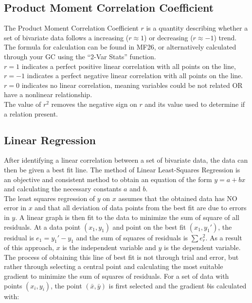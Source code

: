 \documentclass[../main]{subfiles}
\begin{document}
	\subsection{Product Moment Correlation Coefficient}

	The Product Moment Correlation Coefficient \(r\) is a quantity describing whether a set of bivariate data follows a increasing (\(r \approx 1\)) or decreasing (\(r \approx -1\)) trend. The formula for calculation can be found in MF26, or alternatively calculated through your GC using the ``2-Var Stats'' function. \\

	\(r=1\) indicates a perfect positive linear correlation with all points on the line, \(r=-1\) indicates a perfect negative linear correlation with all points on the line. \(r=0\) indicates no linear correlation, meaning variables could be not related OR have a nonlinear relationship. \\

	The value of \(r^2\)  removes the negative sign on \(r\) and its value used to determine if a relation present. \\

	\subsection{Linear Regression}

	After identifying a linear correlation between a set of bivariate data, the data can then be given a best fit line. The method of Linear Least-Squares Regression is an objective and consistent method to obtain an equation of the form \(y=a+bx\) and calculating the necessary constants \(a\) and \(b\). \\

	The least squares regression of \(y\) on \(x\) assumes that the obtained data has NO error in \(x\) and that all deviation of data points from the best fit are due to errors in \(y\). A linear graph is then fit to the data to minimize the sum of square of all residuals. At a data point \((x_1,y_1)\) and point on the best fit \((x_1, y_1')\), the residual is \(e_1 = y_1'-y_1\) and the sum of squares of residuals is \(\sum e_r^2\). As a result of this approach, \(x\) is the independent variable and \(y\) is the dependent variable. \\

	The process of obtaining this line of best fit is not through trial and error, but rather through selecting a central point and calculating the most suitable gradient to minimize the sum of squares of residuals. For a set of data with points \((x_i,y_i)\), the point \((\bar{x},\bar{y})\) is first selected and the gradient \(b\)is calculated with:
\end{document}
